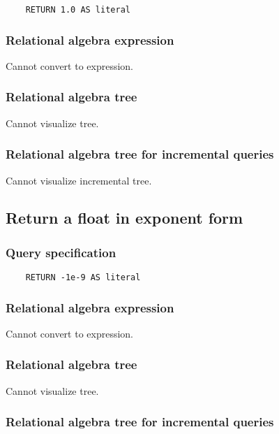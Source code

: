 	\begin{lstlisting}
	RETURN 1.0 AS literal
	\end{lstlisting}


	\subsubsection*{Relational algebra expression}

	Cannot convert to expression.

	\subsubsection*{Relational algebra tree}

	Cannot visualize tree.

	\subsubsection*{Relational algebra tree for incremental queries}

	Cannot visualize incremental tree.
	\subsection{Return a float in exponent form}

	\subsubsection*{Query specification}

	\begin{lstlisting}
	RETURN -1e-9 AS literal
	\end{lstlisting}


	\subsubsection*{Relational algebra expression}

	Cannot convert to expression.

	\subsubsection*{Relational algebra tree}

	Cannot visualize tree.

	\subsubsection*{Relational algebra tree for incremental queries}

